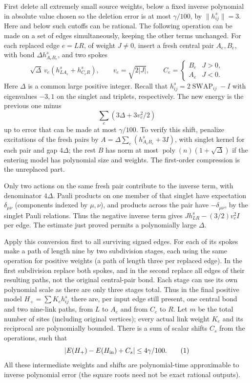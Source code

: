 First delete all extremely small source weights, below a fixed inverse polynomial in absolute value chosen so the deletion error is at most \(\gamma/100\), by \(\|h^s_{ij}\|=3\). Here and below such cutoffs can be rational. The following operation can be made on a set of edges simultaneously, keeping the other terms unchanged. For each replaced edge \(e=LR\), of weight \(J\ne0\), insert a fresh central pair \(A_e,B_e\), with bond \(\Delta h^s_{A_eB_e}\), and two spokes
\[
    \sqrt\Delta\,v_e(h^s_{LA_e}+h^s_{C_eR}),\qquad
    v_e=\sqrt{2|J|},\qquad
    C_e=\begin{cases}B_e& J>0,\\ A_e&J<0.\end{cases}
\]
Here \(\Delta\) is a common large positive integer. Recall that \(h^s_{ij}=2\operatorname{SWAP}_{ij}-I\) with eigenvalues \(-3,1\) on the singlet and triplets, respectively. The new energy is the previous one minus
\[
       \sum_e (3\Delta+3v_e^2/2)
\]
up to error that can be made at most \(\gamma/100\). To verify this shift, penalize excitations of the fresh pairs by \(A=\Delta\sum_e(h^s_{A_eB_e}+3I)\), with singlet kernel for each pair and gap \(4\Delta\); the rest \(B\) has norm at most \(\operatorname{poly}(n)(1+\sqrt\Delta)\) if the entering model has polynomial size and weights. The first-order compression is the unreplaced part.

Only two actions on the same fresh pair contribute to the inverse term, with denominator \(4\Delta\). Pauli products on one member of that singlet have expectation \(\delta_{\mu\nu}\) (components indexed by \(\mu,\nu\)), and products across the pair have \(-\delta_{\mu\nu}\), by the singlet Pauli relations. Thus the negative inverse term gives \(J h^s_{LR}-(3/2)v_e^2 I\) per edge. The estimate just proved permits a polynomially large \(\Delta\).

Apply this conversion first to all surviving signed edges. For each of its spokes make a path of length nine by two subdivision stages, each using the same operation for positive weights (a path of length three per replaced edge). In the first subdivision replace both spokes, and in the second replace all edges of their resulting paths, not the original central-pair bond. Each stage can use its own polynomial scale as there are only three stages total. Thus in the final positive model \(H_+=\sum K_e h^s_{ij}\) there are, per input edge still present, one central bond and two nine-link paths, from \(L\) to \(A_e\) and from \(C_e\) to \(R\). Let \(m\) be the total number of sites (including original vertices); every actual link weight \(K_e\) and its reciprocal are polynomially bounded. There is a sum of scalar shifts \(C_s\) from the operations, such that
\[
           |E(H_+)-E(H_{\rm in})+C_s|\le 4\gamma/100.       \tag{1}\label{eq:1}
\]
All these intermediate weights and shifts are polynomial-time approximable to inverse polynomial error (the square roots need not be exact rational outputs).

